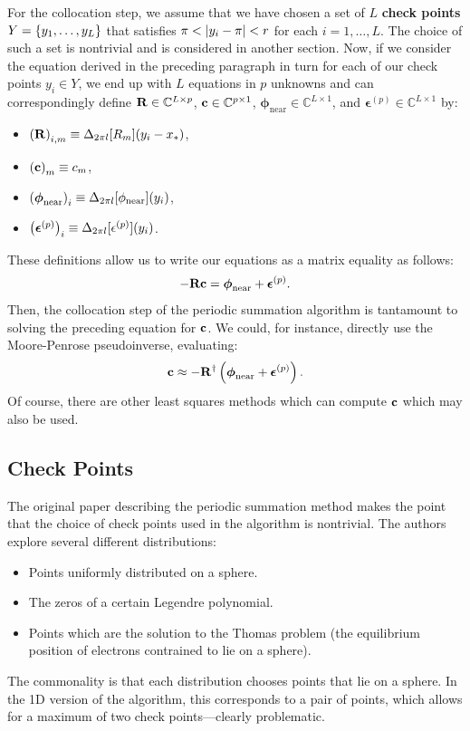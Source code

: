 For the collocation step, we assume that we have chosen a set of $L$
\textbf{check points} $Y = \left\{y_1, \hdots, y_L\right\}$
that satisfies $\pi < \left|y_i - \pi\right| < r$
for each $i = 1, \hdots, L$.
The choice of such a set is nontrivial and is considered in another
section.  Now, if we consider the equation derived in the preceding
paragraph in turn for each of our check points $y_i \in Y$,
we end up with $L$
equations in $p$
unknowns and can correspondingly define
$\bold{R} \in \mathbb{C}^{L \times p}$,
$\bold{c} \in \mathbb{C}^{p \times 1}$,
$\boldsymbol{\phi}_{\operatorname{near}} \in \mathbb{C}^{L \times 1}$,
and $\boldsymbol{\epsilon}^{(p)} \in \mathbb{C}^{L \times 1}$ by:
\begin{itemize}
\item $\left(\bold{R}\right)_{i,m} \equiv \Delta_{2 \pi l}[R_m](y_i - x_*)$,
\item $\left(\bold{c}\right)_m \equiv c_m$,
\item $\left(\boldsymbol{\phi}_{\operatorname{near}}\right)_i \equiv \Delta_{2\pi l}[\phi_{\operatorname{near}}](y_i)$,
\item $\left(\boldsymbol{\epsilon}^{(p)}\right)_i \equiv \Delta_{2\pi l}[\epsilon^{(p)}](y_i)$.
\end{itemize}
These definitions allow us to write our equations as a matrix equality
as follows:
\begin{align*}
  -\bold{R} \bold{c} = \boldsymbol{\phi}_{\operatorname{near}} + \boldsymbol{\epsilon}^{(p)}.
\end{align*}
Then, the collocation step of the periodic summation algorithm is
tantamount to solving the preceding equation for $\bold{c}$.
We could, for instance, directly use the Moore-Penrose pseudoinverse,
evaluating:
\begin{align*}
  \bold{c} \approx -\bold{R}^\dagger \left(\boldsymbol{\phi}_{\operatorname{near}} + \boldsymbol{\epsilon}^{(p)}\right).
\end{align*}
Of course, there are other least squares methods which can compute
$\bold{c}$ which may also be used.

\subsection*{Check Points}

The original paper describing the periodic summation method makes the
point that the choice of check points used in the algorithm is
nontrivial. The authors explore several different distributions:
\begin{itemize}
\item Points uniformly distributed on a sphere.
\item The zeros of a certain Legendre polynomial.
\item Points which are the solution to the Thomas problem (the
  equilibrium position of electrons contrained to lie on a sphere).
\end{itemize}
The commonality is that each distribution chooses points that lie on a
sphere. In the 1D version of the algorithm, this corresponds to a pair
of points, which allows for a maximum of two check points\----clearly
problematic.

